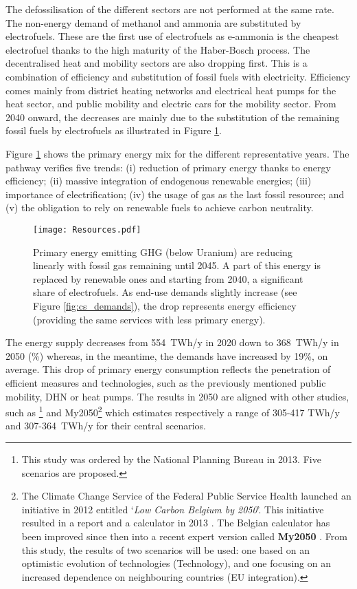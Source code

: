 The defossilisation of the different sectors are not performed at the same rate. The non-energy demand of methanol and ammonia are substituted by electrofuels. These are the first use of electrofuels as  e-ammonia is the cheapest electrofuel thanks to the high maturity of the Haber-Bosch process. The decentralised heat and mobility sectors are also dropping first. This is a combination of efficiency and substitution of fossil fuels with electricity. Efficiency comes mainly from district heating networks and electrical heat pumps for the heat sector, and public mobility and electric cars for the mobility sector. From 2040 onward, the decreases are mainly due to the substitution of the remaining fossil fuels by electrofuels as illustrated in Figure \ref{fig:pestd_primary_energy}.

Figure \ref{fig:pestd_primary_energy} shows the primary energy mix for the different representative years. The pathway verifies five trends: (i) reduction of primary energy thanks to energy efficiency; (ii) massive integration of endogenous renewable energies; (iii) importance of electrification; (iv) the usage of gas as the last fossil resource; and (v) the obligation to rely on renewable fuels to achieve carbon neutrality.

 \begin{figure}[!htbp]
\centering
\texttt{[image: Resources.pdf]}
\caption{Primary energy emitting \gls{GHG} (below Uranium) are reducing linearly with fossil gas remaining until 2045. A part of this energy is replaced by renewable ones and starting from 2040, a significant share of electrofuels. As end-use demands slightly increase (see Figure \ref{fig:cs_demands}), the drop represents energy efficiency (\ie providing the same services with less primary energy).}
\label{fig:pestd_primary_energy}
\end{figure}

The energy supply decreases from 554~TWh/y in 2020 down to 368~TWh/y in 2050 (\%) whereas, in the meantime, the demands have increased by 19\%, on average. This drop of primary energy consumption reflects the penetration of efficient measures and technologies, such as the previously mentioned public mobility, \gls{DHN} or heat pumps. The results in 2050 are aligned with other studies, such as \citet{Devogelaer2013}\footnote{This study was ordered by the National Planning Bureau in 2013. Five scenarios are proposed.} and My2050\footnote{The Climate Change Service of the Federal Public Service Health launched an initiative in 2012 entitled `\emph{Low Carbon Belgium by 2050}'. This initiative resulted in a report and a calculator in 2013 \cite{Cornet2013}. The Belgian calculator has been improved since then into a recent expert version called \textbf{My2050} \cite{My2050}. From this study, the results of two scenarios will be used: one based on an optimistic evolution of technologies (Technology), and one focusing on an increased dependence on neighbouring countries (EU integration).} \cite{My2050} which estimates respectively a range of 305-417 TWh/y and 307-364~TWh/y for their central scenarios. 

